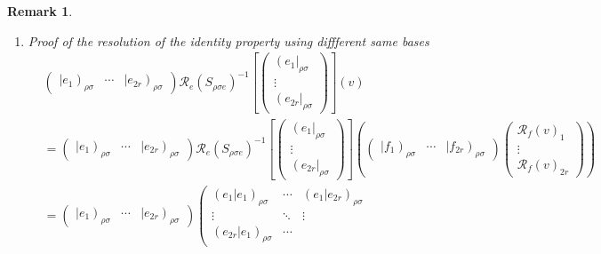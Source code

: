 \documentclass[aps,preprint]{revtex4}
\newtheorem{remark}[theorem]{Remark}
\begin{document}
\begin{remark}
\begin{enumerate}
\begin{enumerate}
\item Proof of the resolution of the identity property using diffferent same
bases%
\begin{align}
& \left( 
\begin{array}{ccc}
\left\vert e_{1}\right) _{\rho \sigma } & \cdots & \left\vert e_{2r}\right)
_{\rho \sigma }%
\end{array}%
\right) \mathcal{R}_{e}\left( S_{\rho \sigma e}\right) ^{-1}\left[ \left( 
\begin{array}{c}
\left( e_{1}\right\vert _{\rho \sigma } \\ 
\vdots \\ 
\left( e_{2r}\right\vert _{\rho \sigma }%
\end{array}%
\right) \right] \left( \overset{}{v}\right) \\
& =\left( 
\begin{array}{ccc}
\left\vert e_{1}\right) _{\rho \sigma } & \cdots & \left\vert e_{2r}\right)
_{\rho \sigma }%
\end{array}%
\right) \mathcal{R}_{e}\left( S_{\rho \sigma e}\right) ^{-1}\left[ \left( 
\begin{array}{c}
\left( e_{1}\right\vert _{\rho \sigma } \\ 
\vdots \\ 
\left( e_{2r}\right\vert _{\rho \sigma }%
\end{array}%
\right) \right] \left( \left( 
\begin{array}{ccc}
\left\vert f_{1}\right) _{\rho \sigma } & \cdots & \left\vert f_{2r}\right)
_{\rho \sigma }%
\end{array}%
\right) \left( 
\begin{array}{c}
\mathcal{R}_{f}\left( v\right) _{1} \\ 
\vdots \\ 
\mathcal{R}_{f}\left( v\right) _{2r}%
\end{array}%
\right) \right) \\
& =\left( 
\begin{array}{ccc}
\left\vert e_{1}\right) _{\rho \sigma } & \cdots & \left\vert e_{2r}\right)
_{\rho \sigma }%
\end{array}%
\right) \left( 
\begin{array}{ccc}
\left( \left. e_{1}\right\vert e_{1}\right) _{\rho \sigma } & \cdots & 
\left( \left. e_{1}\right\vert e_{2r}\right) _{\rho \sigma } \\ 
\vdots & \ddots & \vdots \\ 
\left( \left. e_{2r}\right\vert e_{1}\right) _{\rho \sigma } & \cdots & 

\end{array}
\end{align}
\end{enumerate}
\end{enumerate}
\end{remark}
\end{document}
